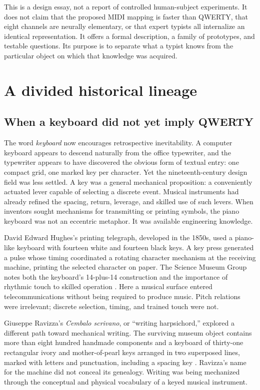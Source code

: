 \documentclass[11pt]{article}
\begin{document}
This is a design essay, not a report of controlled human-subject experiments. It does not claim that the proposed MIDI mapping is faster than QWERTY, that eight channels are neurally elementary, or that expert typists all internalize an identical representation. It offers a formal description, a family of prototypes, and testable questions. Its purpose is to separate what a typist knows from the particular object on which that knowledge was acquired.

\section{A divided historical lineage}

\subsection{When a keyboard did not yet imply QWERTY}

The word \emph{keyboard} now encourages retrospective inevitability. A computer keyboard appears to descend naturally from the office typewriter, and the typewriter appears to have discovered the obvious form of textual entry: one compact grid, one marked key per character. Yet the nineteenth-century design field was less settled. A key was a general mechanical proposition: a conveniently actuated lever capable of selecting a discrete event. Musical instruments had already refined the spacing, return, leverage, and skilled use of such levers. When inventors sought mechanisms for transmitting or printing symbols, the piano keyboard was not an eccentric metaphor. It was available engineering knowledge.

David Edward Hughes's printing telegraph, developed in the 1850s, used a piano-like keyboard with fourteen white and fourteen black keys. A key press generated a pulse whose timing coordinated a rotating character mechanism at the receiving machine, printing the selected character on paper. The Science Museum Group notes both the keyboard's 14-plus-14 construction and the importance of rhythmic touch to skilled operation \cite{hughesmuseum}. Here a musical surface entered telecommunications without being required to produce music. Pitch relations were irrelevant; discrete selection, timing, and trained touch were not.

Giuseppe Ravizza's \emph{Cembalo scrivano}, or ``writing harpsichord,'' explored a different path toward mechanical writing. The surviving museum object contains more than eight hundred handmade components and a keyboard of thirty-one rectangular ivory and mother-of-pearl keys arranged in two superposed lines, marked with letters and punctuation, including a spacing key \cite{ravizzamuseum}. Ravizza's name for the machine did not conceal its genealogy. Writing was being mechanized through the conceptual and physical vocabulary of a keyed musical instrument.
\end{document}
